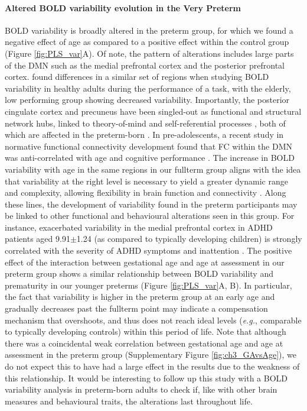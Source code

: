 \paragraph{Altered BOLD variability evolution in the Very Preterm}
BOLD variability is broadly altered in the preterm group, for which we found a negative effect of age as compared to a positive effect within the control group (Figure \ref{fig:PLS_var}A). Of note, the pattern of alterations includes large parts of the DMN such as the medial prefrontal cortex and the posterior prefrontal cortex. \cite{Garrett2011} found differences in a similar set of regions when studying BOLD variability in healthy adults during the performance of a task, with the elderly, low performing group showing decreased variability. Importantly, the posterior cingulate cortex and precuneus have been singled-out as functional and structural network hubs, linked to theory-of-mind and self-referential processes \citep{Spreng2009,VandenHeuvel2013}, both of which are affected in the preterm-born \citep{Papini2016,Witt2018}. In pre-adolescents, a recent study in normative functional connectivity development found that FC within the DMN was anti-correlated with age and cognitive performance \citep{Jiang2018}. The increase in BOLD variability with age in the same regions in our fullterm group aligns with the idea that variability at the right level is necessary to yield a greater dynamic range and complexity, allowing flexibility in brain function and connectivity \citep{McIntosh2010,Deco2011,Garrett2013b}.
Along these lines, the development of variability found in the preterm participants may be linked to other functional and behavioural alterations seen in this group. For instance, exacerbated variability in the medial prefrontal cortex in ADHD patients aged 9.91$\pm$1.24 (as compared to typically developing children) is strongly correlated with the severity of ADHD symptoms and inattention \citep{Nomi2018}. The positive effect of the interaction between gestational age and age at assessment in our preterm group shows a similar relationship between BOLD variability and prematurity in our younger preterms (Figure \ref{fig:PLS_var}A, B). In particular, the fact that variability is higher in the preterm group at an early age and gradually decreases past the fullterm point may indicate a compensation mechanism that overshoots, and thus does not reach ideal levels (\textit{e.g.}, comparable to typically developing controls) within this period of life. Note that although there was a coincidental weak correlation between gestational age and age at assessment in the preterm group (Supplementary Figure \ref{fig:ch3_GAvsAge}), we do not expect this to have had a large effect in the results due to the weakness of this relationship. It would be interesting to follow up this study with a BOLD variability analysis in preterm-born adults to check if, like with other brain measures and behavioural traits, the alterations last throughout life.

